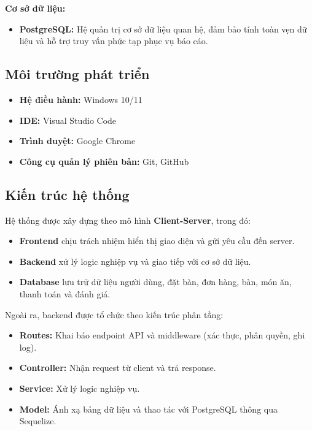 \documentclass[../DoAn.tex]{subfiles}
\begin{document}
\textbf{Cơ sở dữ liệu:}
\begin{itemize}
    \item \textbf{PostgreSQL:} Hệ quản trị cơ sở dữ liệu quan hệ, đảm bảo tính toàn vẹn dữ liệu và hỗ trợ truy vấn phức tạp phục vụ báo cáo.
\end{itemize}

\subsection{Môi trường phát triển}

\begin{itemize}
    \item \textbf{Hệ điều hành:} Windows 10/11
    \item \textbf{IDE:} Visual Studio Code
    \item \textbf{Trình duyệt:} Google Chrome
    \item \textbf{Công cụ quản lý phiên bản:} Git, GitHub
\end{itemize}

\subsection{Kiến trúc hệ thống}

Hệ thống được xây dựng theo mô hình \textbf{Client-Server}, trong đó:
\begin{itemize}
    \item \textbf{Frontend} chịu trách nhiệm hiển thị giao diện và gửi yêu cầu đến server.
    \item \textbf{Backend} xử lý logic nghiệp vụ và giao tiếp với cơ sở dữ liệu.
    \item \textbf{Database} lưu trữ dữ liệu người dùng, đặt bàn, đơn hàng, bàn, món ăn, thanh toán và đánh giá.
\end{itemize}

Ngoài ra, backend được tổ chức theo kiến trúc phân tầng:
\begin{itemize}
    \item \textbf{Routes:} Khai báo endpoint API và middleware (xác thực, phân quyền, ghi log).
    \item \textbf{Controller:} Nhận request từ client và trả response.
    \item \textbf{Service:} Xử lý logic nghiệp vụ.
    \item \textbf{Model:} Ánh xạ bảng dữ liệu và thao tác với PostgreSQL thông qua Sequelize.
\end{itemize}
\end{document}
